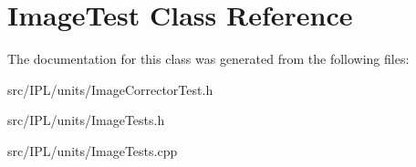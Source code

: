 \hypertarget{classImageTest}{
\section{ImageTest Class Reference}
\label{classImageTest}
}


The documentation for this class was generated from the following files:\begin{DoxyCompactItemize}
\item 
src/IPL/units/ImageCorrectorTest.h\item 
src/IPL/units/ImageTests.h\item 
src/IPL/units/ImageTests.cpp\end{DoxyCompactItemize}

